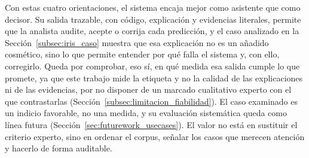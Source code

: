 Con estas cuatro orientaciones, el sistema encaja mejor como asistente que como
decisor. Su salida trazable, con código, explicación y evidencias literales,
permite que la analista audite, acepte o corrija cada predicción, y el caso
analizado en la Sección~\ref{subsec:iris_caso} muestra que esa explicación no es un
añadido cosmético, sino lo que permite entender por qué falla el sistema y, con
ello, corregirlo. Queda por comprobar, eso sí, en qué medida esa salida cumple lo que
promete, ya que este trabajo mide la etiqueta y no la calidad de las explicaciones ni
de las evidencias, por no disponer de un marcado cualitativo experto con el que contrastarlas
(Sección~\ref{subsec:limitacion_fiabilidad}). El caso examinado es un indicio
favorable, no una medida, y su evaluación sistemática queda como línea futura
(Sección~\ref{sec:futurework_usecases}). El valor no está en sustituir el criterio
experto, sino en
ordenar el corpus, señalar los casos que merecen atención y hacerlo de forma
auditable.

